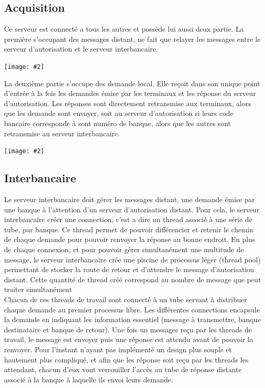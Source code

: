 \documentclass[french, a4paper, 12pt, titlepage]{article}
\newcommand{\graph}[2]{
\medskip
	\begin{center}
		\texttt{[image: \#2]}
	\end{center}
\medskip
}
\begin{document}
\subsection{Acquisition}
Ce serveur est connecté a tous les autres et possède lui aussi deux partie.
La première s'occupant des messages distant, ne fait que relayer les messages entre le serveur d'autorisation et le serveur interbancaire.
\graph{0.5}{acquisitionStateRemote}
La deuxième partie s'occupe des demande local. Elle reçoit dans son unique point d'entrée à la fois les demandes émise par les terminaux et les réponse du serveur d'autorisation.
Les réponses sont directement retransmise aux terminaux, alors que les demande sont envoyer, soit au serveur d'autorisation si leurs code bancaire corresponde à sont numéro de banque, alors que les autres sont retransmise au serveur interbancaire.
\graph{0.4}{acquisitionStateLocal}

\subsection{Interbancaire}
Le serveur interbancaire doit gérer les messages distant, une demande émise par une banque à l'attention d'un serveur d'autorisation distant.
Pour cela, le serveur interbancaire créer une \og connection\fg{}, c'est a dire un thread associé à une série de tube, par banque.
Ce thread permet de pouvoir différencier et retenir le chemin de chaque demande pour pouvoir renvoyer la réponse au bonne endroit.
En plus de chaque connexion, et pour pouvoir gérer simultanément une multitude de message, le serveur interbancaire crée une piscine de processus léger (thread pool)
permettant de stocker la route de retour et d'attendre le message d'autorisation distant.
Cette quantité de thread créé correspond au nombre de message que peut traiter simultanément \\

Chacun de ces threads de travail sont connecté à un tube servant à distribuer chaque demande au premier processus libre.
Les différentes connections encapsule la demande en indiquant les information essentiel (message à transmettre, banque destinataire et banque de retour).
Une fois un messages reçu par les threads de travail, le message est envoyer puis une réponse est attendu avant de pouvoir la renvoyer.
Pour l'instant n'ayant pas implémenté un design plus souple et hautement plus compliqué, et afin que les réponse soit reçu par les threads les attendant, chacun d'eux vont verrouiller l'accès au tube de réponse distante associé à la banque à laquelle ils envoi leurs demande.
\end{document}

